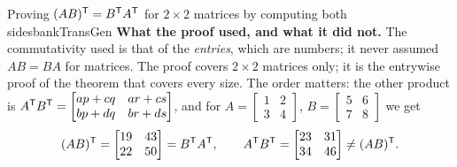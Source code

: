 \documentclass[11pt]{article}
\begin{document}
\begin{exmp}{Proving $(AB)^{\mathsf T}=B^{\mathsf T} A^{\mathsf T}$ for $2\times2$ matrices by computing both sides}{bankTransGen}
\textbf{What the proof used, and what it did not.} The commutativity used is that of the \emph{entries}, which are numbers; it never assumed $AB=BA$ for matrices. The proof covers $2\times2$ matrices only; it is the entrywise proof of the theorem that covers every size. The order matters: the other product is $A^{\mathsf T} B^{\mathsf T}=\begin{bmatrix}ap+cq&ar+cs\\bp+dq&br+ds\end{bmatrix}$, and for $A=\begin{bmatrix}1&2\\3&4\end{bmatrix}$, $B=\begin{bmatrix}5&6\\7&8\end{bmatrix}$ we get
\[
(AB)^{\mathsf T}=\begin{bmatrix}19&43\\22&50\end{bmatrix}=B^{\mathsf T} A^{\mathsf T},\qquad A^{\mathsf T} B^{\mathsf T}=\begin{bmatrix}23&31\\34&46\end{bmatrix}\neq(AB)^{\mathsf T} .
\]
\end{exmp}
\end{document}
